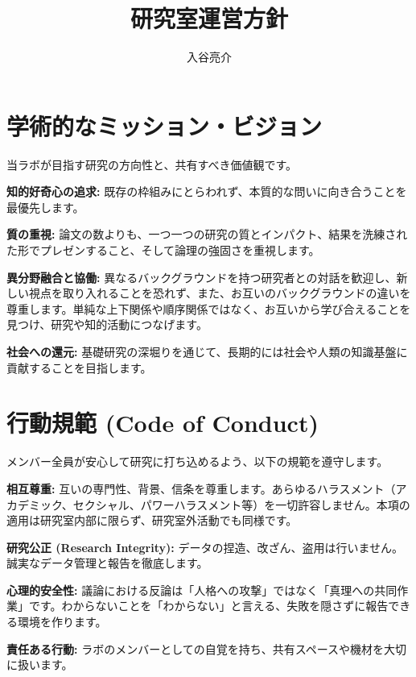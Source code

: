 \documentclass[a4paper,11pt]{ltjsarticle}
\title{研究室運営方針}
\author{入谷亮介}
\begin{document}
\maketitle
\section{学術的なミッション・ビジョン}
当ラボが目指す研究の方向性と、共有すべき価値観です。

\begin{compactitem}
    \item \textbf{知的好奇心の追求:} 既存の枠組みにとらわれず、本質的な問いに向き合うことを最優先します。
    \item \textbf{質の重視:} 論文の数よりも、一つ一つの研究の質とインパクト、結果を洗練された形でプレゼンすること、そして論理の強固さを重視します。
    \item \textbf{異分野融合と協働:} 異なるバックグラウンドを持つ研究者との対話を歓迎し、新しい視点を取り入れることを恐れず、また、お互いのバックグラウンドの違いを尊重します。単純な上下関係や順序関係ではなく、お互いから学び合えることを見つけ、研究や知的活動につなげます。
    \item \textbf{社会への還元:} 基礎研究の深堀りを通じて、長期的には社会や人類の知識基盤に貢献することを目指します。
\end{compactitem}

\section{行動規範 (Code of Conduct)}
メンバー全員が安心して研究に打ち込めるよう、以下の規範を遵守します。

\begin{compactitem}
    \item \textbf{相互尊重:} 互いの専門性、背景、信条を尊重します。あらゆるハラスメント（アカデミック、セクシャル、パワーハラスメント等）を一切許容しません。本項の適用は研究室内部に限らず、研究室外活動でも同様です。
    \item \textbf{研究公正 (Research Integrity):} データの捏造、改ざん、盗用は行いません。誠実なデータ管理と報告を徹底します。
    \item \textbf{心理的安全性:} 議論における反論は「人格への攻撃」ではなく「真理への共同作業」です。わからないことを「わからない」と言える、失敗を隠さずに報告できる環境を作ります。
    \item \textbf{責任ある行動:} ラボのメンバーとしての自覚を持ち、共有スペースや機材を大切に扱います。
\end{compactitem}
\end{document}
